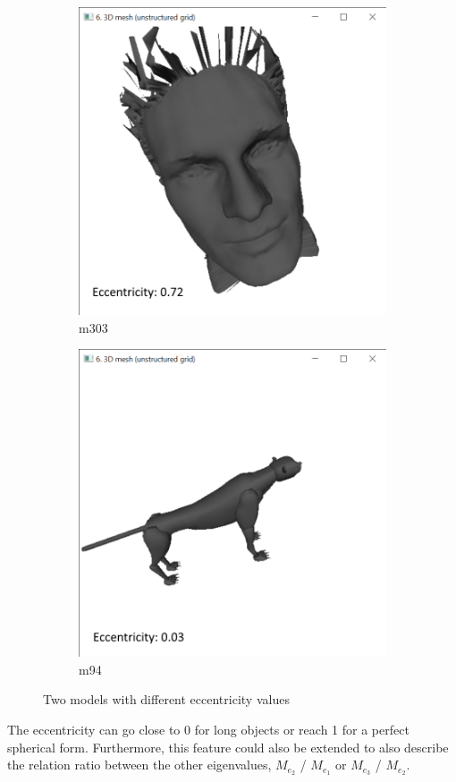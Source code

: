 \documentclass{bigdata}
\begin{document}
\begin{figure}[b!]
  \centering
  \begin{subfigure}[b]{0.4\linewidth}
    \includegraphics[width=\linewidth]{Pictures/Part3/eccHead.png}
    \caption{m303}
  \end{subfigure}
  \begin{subfigure}[b]{0.4\linewidth}
    \includegraphics[width=\linewidth]{Pictures/Part3/eccLeo.png}
    \caption{m94}
  \end{subfigure}
  \caption{Two models with different eccentricity values}
  \label{fig:eccentricity}
\end{figure}
\noindent The eccentricity can go close to 0 for long objects or reach 1 for a perfect spherical form. Furthermore, this feature could also be extended to also describe the relation ratio between the other eigenvalues, $M_{e_2}$ / $M_{e_1}$ or $M_{e_3}$ / $M_{e_2}$. 
\end{document}
